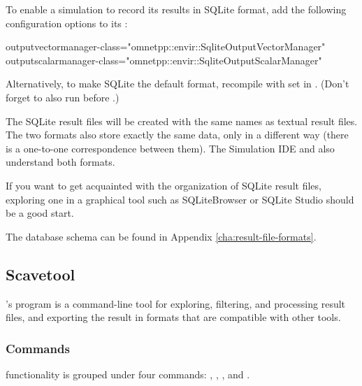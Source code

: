 To enable a simulation to record its results in SQLite format, add the following
configuration options to its :

\begin{inifile}
outputvectormanager-class="omnetpp::envir::SqliteOutputVectorManager"
outputscalarmanager-class="omnetpp::envir::SqliteOutputScalarManager"
\end{inifile}

\begin{note}
Alternatively, to make SQLite the default format, recompile {\opp} with
 set in .
(Don't forget to also run   before .)
\end{note}

The SQLite result files will be created with the same names as textual
result files. The two formats also store exactly the same data, only in
a different way (there is a one-to-one correspondence between them). The
Simulation IDE and  also understand both formats.

\begin{hint}
If you want to get acquainted with the organization of SQLite result
files, exploring one in a graphical tool such as SQLiteBrowser or SQLite
Studio should be a good start.
\end{hint}

The database schema can be found in Appendix \ref{cha:result-file-formats}.



\subsection{Scavetool}
\label{sec:ana-sim:scavetool}

{\opp}'s  program is a command-line tool for exploring,
filtering, and processing result files, and exporting the result in formats
that are compatible with other tools.

\subsubsection{Commands}
\label{sec:ana-sim:scavetool:commands}

 functionality is grouped under four commands:
, , , and .

